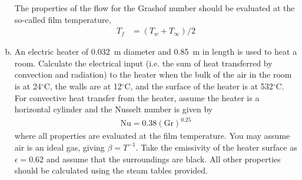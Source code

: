 \documentclass[calculator,datasheet,handbook]{exam}
\begin{document}
\begin{question}
\begin{enumerate}[a)]
{      The properties of the flow for the Grashof number should be
      evaluated at the so-called film temperature,
      \begin{align*}
        T_f &= \left(T_w+T_\infty\right) / 2
      \end{align*}
    }
  \item   An electric heater of 0.032~m diameter and 0.85~m in length is
    used to heat a room. Calculate the electrical input (i.e. the sum
    of heat transferred by convection and radiation) to the heater
    when the bulk of the air in the room is at 24${}^\circ$C, the
    walls are at 12${}^\circ$C, and the surface of the heater is at
    532${}^\circ$C. For convective heat transfer from the heater,
    assume the heater is a horizontal cylinder and the Nusselt number
    is given by
    \begin{align*}
      \text{Nu}=0.38(\text{Gr})^{0.25}
    \end{align*}
    where all properties are evaluated at the film temperature. You
    may assume air is an ideal gas, giving $\beta=T^{-1}$. Take the
    emissivity of the heater surface as ${\epsilon=0.62}$ and assume
    that the surroundings are black. All other properties should be
    calculated using the steam tables provided.%
\end{enumerate}
\end{question}
\end{document}
